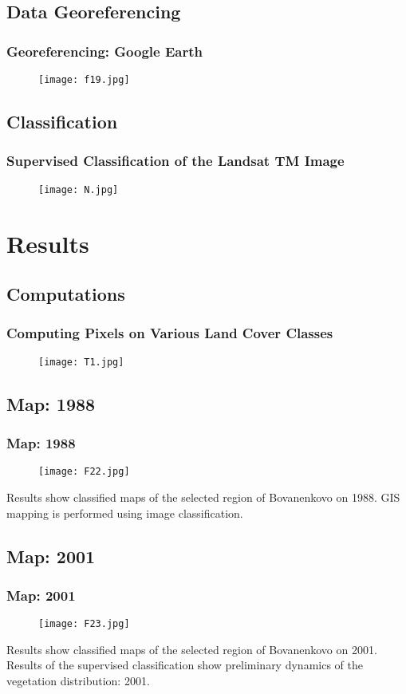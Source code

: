 \documentclass[pdflatex,compress,8pt,
	xcolor={dvipsnames,dvipsnames,svgnames,x11names,table},
	hyperref={colorlinks = true,breaklinks = true, urlcolor = NavyBlue, breaklinks = true}]{beamer}
\begin{document}
\subsection{Data Georeferencing}
\begin{frame}\frametitle{Georeferencing: Google Earth}
\begin{figure}[H]
	\centering
		\texttt{[image: f19.jpg]}
\end{figure}
\end{frame}

\subsection{Classification}
\begin{frame}\frametitle{Supervised Classification of the Landsat TM Image}
\begin{figure}[H]
	\centering
		\texttt{[image: N.jpg]}
\end{figure}
\end{frame}

\section{Results}
\subsection{Computations}
\begin{frame}\frametitle{Computing Pixels on Various Land Cover Classes}
\begin{figure}[H]
	\centering
		\texttt{[image: T1.jpg]}
\end{figure}
\end{frame}

\subsection{Map: 1988}
\begin{frame}\frametitle{Map: 1988}
\begin{figure}[H]
	\centering
		\texttt{[image: F22.jpg]}
\end{figure}
\small{Results show classified maps of the selected region of Bovanenkovo on 1988. GIS mapping is performed using image classification.} 
\end{frame}

\subsection{Map: 2001}
\begin{frame}\frametitle{Map: 2001}
\begin{figure}[H]
	\centering
		\texttt{[image: F23.jpg]}
\end{figure}
\small{Results show classified maps of the selected region of Bovanenkovo on 2001. \\
Results of the supervised classification show preliminary dynamics of the vegetation distribution: 2001.} 
\end{frame}
\end{document}
